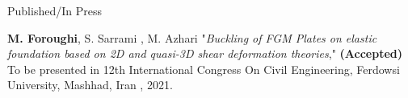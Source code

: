 \begin{cvskills}
  \cvskill 
{Published/In Press} %
{
			\item \textbf{M. Foroughi}, S. Sarrami , M. Azhari "\textit{Buckling of FGM Plates on elastic foundation based on 2D and quasi-3D shear deformation theories}," \textbf{(Accepted)}  To be presented in  12th International Congress On Civil Engineering, Ferdowsi University, Mashhad, Iran , 2021.}
 	\end{cvskills}


